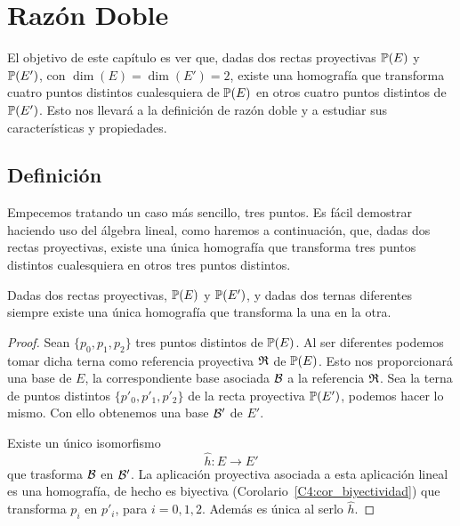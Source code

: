\chapter{Razón Doble}
El objetivo de este capítulo es ver que, dadas dos rectas proyectivas $\mathbb{P}(E)$ y $\mathbb{P}(E')$, con $\dim(E)=\dim(E')=2$,  existe una homografía que transforma cuatro puntos distintos cualesquiera de $\mathbb{P}(E)$ en otros cuatro puntos distintos de $\mathbb{P}(E')$. Esto nos llevará a la definición de razón doble y a estudiar sus características y propiedades.

\section{Definición}
Empecemos tratando un caso más sencillo, tres puntos. Es fácil demostrar haciendo uso del álgebra lineal, como haremos a continuación, que, dadas dos rectas proyectivas, existe una única homografía que transforma tres puntos distintos cualesquiera en otros tres puntos distintos.

\begin{prop}
	\label{C5_prop_homografia3puntos}
	Dadas dos rectas proyectivas, $\mathbb{P}(E)$ y $\mathbb{P}(E')$, y dadas dos ternas diferentes siempre existe una única homografía que transforma la una en la otra.
\end{prop}
\begin{proof}
	Sean $\{p_0,p_1,p_2\}$ tres puntos distintos de $\mathbb{P}(E)$. Al ser diferentes podemos tomar dicha terna como referencia proyectiva $\mathfrak{R}$ de $\mathbb{P}(E)$. Esto nos proporcionará una base de $E$, la correspondiente base asociada $\mathcal{B}$ a la referencia $\mathfrak{R}$. Sea la terna de puntos distintos $\{p'_0,p'_1,p'_2\}$ de la recta proyectiva $\mathbb{P}(E')$, podemos hacer lo mismo. Con ello obtenemos una base $\mathcal{B'}$ de $E'$. 
	
	Existe un único isomorfismo 
	\[\widehat{h}:E\rightarrow E'\]
	que trasforma $\mathcal{B}$ en $\mathcal{B'}$. La aplicación proyectiva asociada a esta aplicación lineal es una homografía, de hecho es biyectiva (Corolario~\ref{C4:cor_biyectividad}) que transforma $p_i$ en $p'_i$, para $i=0,1,2$. Además es única al serlo $\widehat{h}$.
\end{proof}

